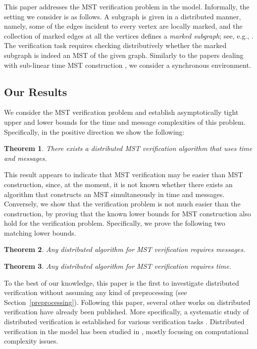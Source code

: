 \documentclass[11pt,letter]{article}
\newtheorem{theorem}{Theorem}[section]
\begin{document}
This paper addresses the MST verification problem in the  model. 
Informally, the setting we consider is as follows. 
A subgraph is given in a distributed manner, namely, some of 
the edges incident to every vertex are locally marked, and the collection of 
marked edges at all the vertices defines a {\em marked subgraph}; see, e.g., 
\cite{CGKK95,GHS_83,KK07,KKP10}. The verification task requires checking 
distributively whether the marked subgraph is indeed an MST of the given graph. 
Similarly to the papers dealing with sub-linear time MST construction 
\cite{GKP98,KP_98}, we consider a synchronous environment. 


\subsection{Our Results}

We consider the MST verification problem and establish asymptotically tight 
upper and lower bounds for the time and message complexities of this problem.
Specifically, in the positive direction we show the following:

\begin{theorem}
\label{thm:upper-bound}
There exists a distributed MST verification algorithm that uses
 time and  messages.
\end{theorem}


This result appears to indicate that MST verification may be easier than 
MST construction, since, at the moment,  it is not known whether there exists an algorithm that constructs an MST simultaneously in  time and  messages. 
Conversely, we show that the verification problem 
is not much easier than the construction, by proving that the known lower bounds for MST construction
also hold for the verification problem. Specifically, we prove the following two matching lower bounds.

 
\begin{theorem} 
\label{thm:lower-bound-msgs}
Any distributed algorithm for 
MST verification 
requires  messages.
\end{theorem}

\begin{theorem} 
\label{thm:lower-bound-time}
Any distributed algorithm for 
MST verification 
requires  time.
\end{theorem}


To the best of our knowledge, this paper is the first to investigate
distributed verification  without assuming any kind of preprocessing (see Section~\ref{preprocessing}). Following this paper, several other works on distributed verification have already been published. More specifically, a systematic study of distributed verification is established for various verification tasks \cite{DHKKNPPW}. Distributed verification in the  model has been studied in \cite{FKP11,FKPP12}, mostly focusing on computational complexity issues.
\end{document}
